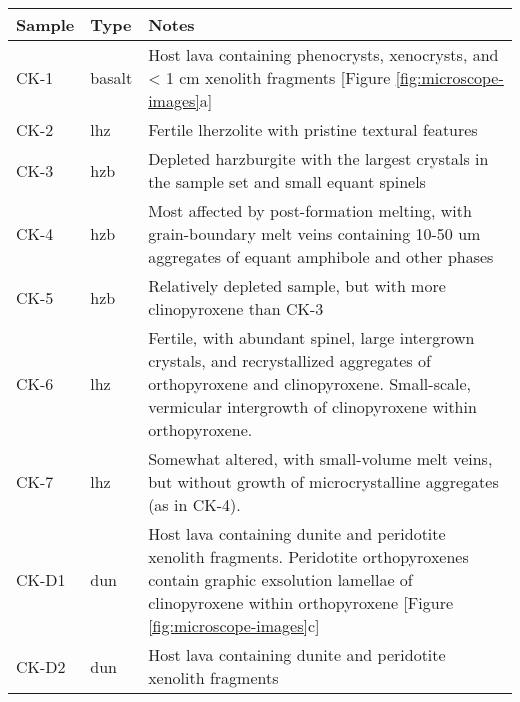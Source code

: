 \begin{tabularx}{\textwidth}{l l X}
\toprule
  Sample & Type & Notes \\
\midrule
  CK-1 & basalt & Host lava containing phenocrysts, xenocrysts, and < 1 cm xenolith fragments [Figure \ref{fig:microscope-images}a] \\
  CK-2 & lhz & Fertile lherzolite with pristine textural features \\
  CK-3 & hzb & Depleted harzburgite with the largest crystals in the sample set and small equant spinels \\
  CK-4 & hzb & Most affected by post-formation melting, with grain-boundary melt veins containing
               10-50 \si{um} aggregates of equant amphibole and other phases \\
  CK-5 & hzb & Relatively depleted sample, but with more clinopyroxene than CK-3 \\
  CK-6 & lhz & Fertile, with abundant spinel, large intergrown crystals, and recrystallized aggregates of orthopyroxene and clinopyroxene. Small-scale,
               vermicular intergrowth of clinopyroxene within orthopyroxene. \\
  CK-7 & lhz & Somewhat altered, with small-volume melt veins, but without growth of microcrystalline aggregates (as in CK-4). \\
  CK-D1 & dun & Host lava containing dunite and peridotite xenolith fragments. Peridotite orthopyroxenes contain graphic exsolution
               lamellae of  clinopyroxene within orthopyroxene [Figure \ref{fig:microscope-images}c] \\
  CK-D2 & dun & Host lava containing dunite and peridotite xenolith fragments \\
\bottomrule
\end{tabularx}
